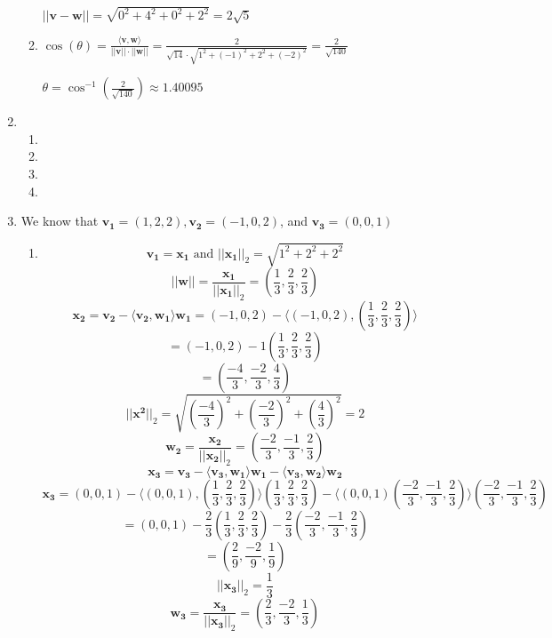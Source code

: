 \documentclass[12pt]{article}
\begin{document}
\begin{enumerate}[leftmargin=0em]
\begin{enumerate}[leftmargin=!]
    $||\mathbf{v} - \mathbf{w}|| = \sqrt{0^{2} + 4^{2} + 0^{2} + 2^{2}} = 2\sqrt{5}$

    \item $\cos(\theta) = \frac{\langle \mathbf{v}, \mathbf{w} \rangle}{||\mathbf{v}||\cdot||\mathbf{w}||} = \frac{2}{\sqrt{14} \cdot \sqrt{1^{2} + (-1)^{2} + 2^{2} + (-2)^{2}}} = \frac{2}{\sqrt{140}}$ 
    
    $\theta = \cos^{-1}(\frac{2}{\sqrt{140}}) \approx 1.40095$
  \end{enumerate}


  \item
  \begin{enumerate}[leftmargin=!]
    \item

    \item

    \item

    \item
  \end{enumerate}

  \item
  We know that $\mathbf{v_1} = (1, 2, 2), \mathbf{v_2} = (-1, 0, 2)$, and $\mathbf{v_3} = (0,0,1)$

  \begin{enumerate}[leftmargin=!]
    \item
    \[ \mathbf{v_1} = \mathbf{x_1} \text{ and } ||\mathbf{x_1}||_{2} = \sqrt{1^2+2^2+2^2}\]
    \[ ||\mathbf{w}|| = \frac{\mathbf{x_1}}{||\mathbf{x_1}||_2} = (\frac{1}{3}, \frac{2}{3}, \frac{2}{3}) \]
    \[ \mathbf{x_2} = \mathbf{v_2} - \langle \mathbf{v_2}, \mathbf{w_1} \rangle \mathbf{w_1} = (-1, 0, 2) - \langle (-1, 0, 2) , (\frac{1}{3}, \frac{2}{3}, \frac{2}{3}) \rangle\]
    \[ = (-1, 0, 2) - 1(\frac{1}{3}, \frac{2}{3}, \frac{2}{3})\]
    \[ = (\frac{-4}{3}, \frac{-2}{3}, \frac{4}{3})\]   
    \[||\mathbf{x^2}||_2 = \sqrt{(\frac{-4}{3})^{2} + (\frac{-2}{3})^{2} + (\frac{4}{3})^{2}} = 2\] 
    \[ \mathbf{w_2} = \frac{\mathbf{x_2}}{||\mathbf{x_2}||_2} = (\frac{-2}{3}, \frac{-1}{3}, \frac{2}{3})\]
    \[ \mathbf{x_3} = \mathbf{v_3} - \langle \mathbf{v_3}, \mathbf{w_1} \rangle \mathbf{w_1} - \langle \mathbf{v_3}, \mathbf{w_2} \rangle \mathbf{w_2}\]
    \[ \mathbf{x_3} = (0, 0, 1) - \langle (0, 0, 1), (\frac{1}{3}, \frac{2}{3}, \frac{2}{3})\rangle (\frac{1}{3}, \frac{2}{3}, \frac{2}{3}) - \langle (0,0,1) (\frac{-2}{3}, \frac{-1}{3}, \frac{2}{3}) \rangle (\frac{-2}{3}, \frac{-1}{3}, \frac{2}{3})\]
    \[ = (0,0,1) - \frac{2}{3}(\frac{1}{3}, \frac{2}{3}, \frac{2}{3}) - \frac{2}{3}(\frac{-2}{3}, \frac{-1}{3}, \frac{2}{3})\]
    \[ = (\frac{2}{9}, \frac{-2}{9}, \frac{1}{9})\]
    \[ || \mathbf{x_3} ||_2 = \frac{1}{3} \]
    \[ \mathbf{w_3} = \frac{\mathbf{x_3}}{||\mathbf{x_3}||_2} = (\frac{2}{3}, \frac{-2}{3}, \frac{1}{3})\]


\end{enumerate}
\end{enumerate}
\end{document}
